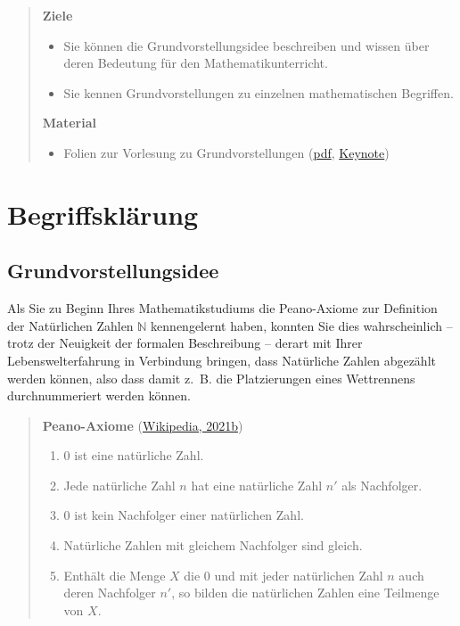 \documentclass[
]{scrbook}
\providecommand{\tightlist}{%
  \setlength{\itemsep}{0pt}\setlength{\parskip}{0pt}}
\theoremstyle{definition}
\theoremstyle{definition}
\theoremstyle{definition}
\theoremstyle{definition}
\theoremstyle{remark}
\begin{document}
\begin{quote}
\textbf{Ziele}

\begin{itemize}
\tightlist
\item
  Sie können die Grundvorstellungsidee beschreiben und wissen über deren Bedeutung für den Mathematikunterricht.
\item
  Sie kennen Grundvorstellungen zu einzelnen mathematischen Begriffen.
\end{itemize}

\textbf{Material}

\begin{itemize}
\tightlist
\item
  Folien zur Vorlesung zu Grundvorstellungen (\href{files/Stoffdidaktik-WiSe2223-Kap3.pdf}{pdf}, \href{files/Stoffdidaktik-WiSe2223-Kap3.key}{Keynote})
\end{itemize}
\end{quote}

\hypertarget{grundvorstellungen-begriffsklaerung}{%
\section{Begriffsklärung}\label{grundvorstellungen-begriffsklaerung}}

\hypertarget{grundvorstellungsidee}{%
\subsection{Grundvorstellungsidee}\label{grundvorstellungsidee}}

Als Sie zu Beginn Ihres Mathematikstudiums die Peano-Axiome zur Definition der Natürlichen Zahlen \(\mathbb{N}\) kennengelernt haben, konnten Sie dies wahrscheinlich -- trotz der Neuigkeit der formalen Beschreibung -- derart mit Ihrer Lebenswelterfahrung in Verbindung bringen, dass Natürliche Zahlen abgezählt werden können, also dass damit z.~B. die Platzierungen eines Wettrennens durchnummeriert werden können.

\begin{quote}
\textbf{Peano-Axiome} (\protect\hyperlink{ref-WikiPeano}{Wikipedia, 2021b})

\begin{enumerate}
\def\labelenumi{\arabic{enumi}.}
\tightlist
\item
  \(0\) ist eine natürliche Zahl.
\item
  Jede natürliche Zahl \(n\) hat eine natürliche Zahl \(n'\) als Nachfolger.
\item
  \(0\) ist kein Nachfolger einer natürlichen Zahl.
\item
  Natürliche Zahlen mit gleichem Nachfolger sind gleich.
\item
  Enthält die Menge \(X\) die \(0\) und mit jeder natürlichen Zahl \(n\) auch deren Nachfolger \(n'\), so bilden die natürlichen Zahlen eine Teilmenge von \(X\).
\end{enumerate}
\end{quote}
\end{document}
